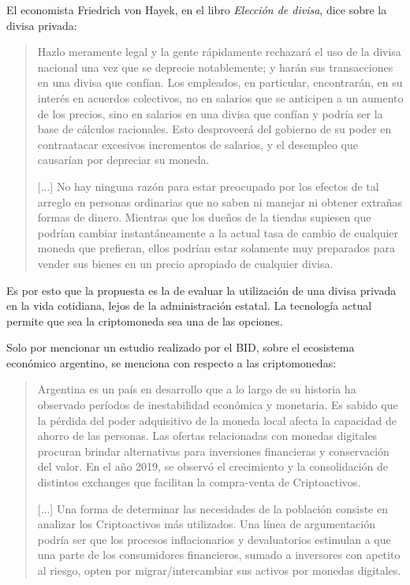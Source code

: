 \documentclass[12pt,a4paper,twoside]{book}
\begin{document}
El economista Friedrich von Hayek, en el libro \textit{Elección de divisa}, dice sobre la divisa privada:

\begin{quotation}
Hazlo meramente legal y la gente rápidamente rechazará el uso de la divisa nacional una vez que se deprecie notablemente; y harán sus transacciones en una divisa que confían. Los empleados, en particular, encontrarán, en su interés en acuerdos colectivos, no en salarios que se anticipen a un aumento de los precios, sino en salarios en una divisa que confían y podría ser la base de cálculos racionales. Esto desproveerá del gobierno de su poder en contraatacar excesivos incrementos de salarios, y el desempleo que causarían por depreciar su moneda.

[...] No hay ninguna razón para estar preocupado por los efectos de tal arreglo en personas ordinarias que no saben ni manejar ni obtener extrañas formas de dinero. Mientras que los dueños de la tiendas supiesen que podrían cambiar instantáneamente a la actual tasa de cambio de cualquier moneda que prefieran, ellos podrían estar solamente muy preparados para vender sus bienes en un precio apropiado de cualquier divisa. \cite[pág. 19]{hayek:choice-currency}
\end{quotation}

Es por esto que la propuesta es la de evaluar la utilización de una divisa privada en la vida cotidiana, lejos de la administración estatal. La tecnología actual permite que sea la criptomoneda sea una de las opciones.

Solo por mencionar un estudio realizado por el BID, sobre el ecosistema económico argentino, se menciona con respecto a las criptomonedas:

\begin{quotation}
Argentina es un país en desarrollo que a lo largo de su historia ha observado períodos de inestabilidad económica y monetaria. Es sabido que la pérdida del poder adquisitivo de la moneda local afecta la capacidad de ahorro de las personas. Las ofertas relacionadas con monedas digitales procuran brindar alternativas para inversiones financieras y conservación del valor. En el año 2019, se observó el crecimiento y la consolidación de distintos exchanges que facilitan la compra-venta de Criptoactivos.

[...] Una forma de determinar las necesidades de la población consiste en analizar los Criptoactivos más utilizados. Una línea de argumentación podría ser que los procesos inflacionarios y devaluatorios estimulan a que una parte de los consumidores financieros, sumado a inversores con apetito al riesgo, opten por migrar/intercambiar sus activos por monedas digitales. \cite[págs. 45-46]{bid:criptos}
\end{quotation}
\end{document}
